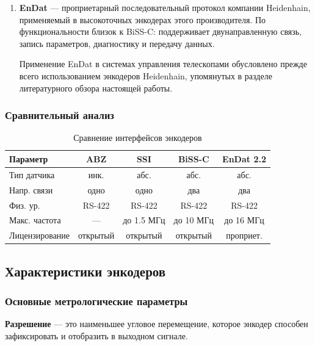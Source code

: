 \begin{enumerate}
\item \textbf{EnDat} --- проприетарный последовательный протокол компании Heidenhain, применяемый в высокоточных энкодерах этого производителя. По функциональности близок к BiSS-C: поддерживает двунаправленную связь, запись параметров, диагностику и передачу данных.

Применение EnDat в системах управления телескопами обусловлено прежде всего использованием энкодеров Heidenhain, упомянутых в разделе литературного обзора настоящей работы.
\end{enumerate}

\subsubsection*{Сравнительный анализ}

\begin{table}[h]
    \centering
    \begin{tabular}{|l|c|c|c|c|}
        \hline
        Параметр & ABZ & SSI & BiSS-C & EnDat 2.2 \\
        \hline
        Тип датчика &
        инк. &
        абс. &
        абс. &
        абс. \\
        \hline
        Напр. связи &
        одно &
        одно &
        два &
        два \\
        \hline
        Физ. ур. &
        RS-422 &
        RS-422 &
        RS-422 &
        RS-422 \\
        \hline
        Макс. частота &
        --- &
        до 1.5 МГц &
        до 10 МГц &
        до 16 МГц \\
        \hline
        Лицензирование &
        открытый &
        открытый &
        открытый &
        проприет. \\
        \hline
    \end{tabular}
    \caption{Сравнение интерфейсов энкодеров}
\end{table}

\subsection{Характеристики энкодеров}

\subsubsection{Основные метрологические параметры}

\textbf{Разрешение} --- это наименьшее угловое перемещение, которое энкодер способен зафиксировать и отобразить в выходном сигнале.

